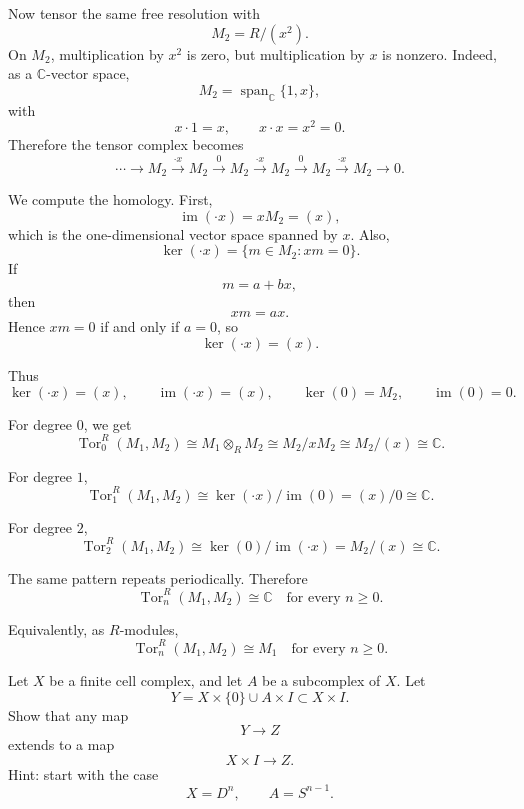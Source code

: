 \begin{solution}
Now tensor the same free resolution with
\[
M_2=R/(x^2).
\]
On \(M_2\), multiplication by \(x^2\) is zero, but multiplication by \(x\) is nonzero. Indeed, as a \(\mathbb C\)-vector space,
\[
M_2=\operatorname{span}_{\mathbb C}\{1,x\},
\]
with
\[
x\cdot 1=x,\qquad x\cdot x=x^2=0.
\]
Therefore the tensor complex becomes
\[
\cdots
\longrightarrow
M_2
\xrightarrow{\cdot x}
M_2
\xrightarrow{0}
M_2
\xrightarrow{\cdot x}
M_2
\xrightarrow{0}
M_2
\xrightarrow{\cdot x}
M_2
\longrightarrow
0.
\]

We compute the homology. First,
\[
\operatorname{im}(\cdot x)=xM_2=(x),
\]
which is the one-dimensional vector space spanned by \(x\). Also,
\[
\ker(\cdot x)=\{m\in M_2:xm=0\}.
\]
If
\[
m=a+bx,
\]
then
\[
xm=ax.
\]
Hence \(xm=0\) if and only if \(a=0\), so
\[
\ker(\cdot x)=(x).
\]

Thus
\[
\ker(\cdot x)=(x),
\qquad
\operatorname{im}(\cdot x)=(x),
\qquad
\ker(0)=M_2,
\qquad
\operatorname{im}(0)=0.
\]

For degree \(0\), we get
\[
\operatorname{Tor}^R_0(M_1,M_2)
\cong
M_1\otimes_R M_2
\cong
M_2/xM_2
\cong
M_2/(x)
\cong
\mathbb C.
\]

For degree \(1\),
\[
\operatorname{Tor}^R_1(M_1,M_2)
\cong
\ker(\cdot x)/\operatorname{im}(0)
=
(x)/0
\cong
\mathbb C.
\]

For degree \(2\),
\[
\operatorname{Tor}^R_2(M_1,M_2)
\cong
\ker(0)/\operatorname{im}(\cdot x)
=
M_2/(x)
\cong
\mathbb C.
\]

The same pattern repeats periodically. Therefore
\[
\boxed{
	\operatorname{Tor}^R_n(M_1,M_2)\cong \mathbb C
	\quad \text{for every } n\geq 0.
}
\]

Equivalently, as \(R\)-modules,
\[
\boxed{
	\operatorname{Tor}^R_n(M_1,M_2)\cong M_1
	\quad \text{for every } n\geq 0.
}
\]
\end{solution}

\begin{problem}
Let \(X\) be a finite cell complex, and let \(A\) be a subcomplex of \(X\). Let
\[
Y=X\times\{0\}\cup A\times I
\subset X\times I.
\]
Show that any map
\[
Y\longrightarrow Z
\]
extends to a map
\[
X\times I\longrightarrow Z.
\]
Hint: start with the case
\[
X=D^n,\qquad A=S^{n-1}.
\]
\end{problem}

